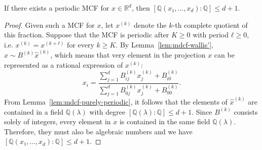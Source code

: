 \begin{theorem}
  \label{thm:mdcf-periodic}
  If there exists a periodic MCF for $x ∈ ℝ^d$,
  then $[ℚ(x₁, …, x_d) : ℚ] ≤ d + 1$.
\end{theorem}

\begin{proof}
  Given such a MCF for $x$, let $x^{(k)}$ denote the $k$-th complete quotient
  of this fraction.
  Suppose that the MCF is periodic after $K ≥ 0$ with period $ℓ ≥ 0$, i.e.
  $x^{(k)} = x^{(k+ℓ)}$ for every $k ≥ K$.
  By Lemma~\ref{lem:mdcf-wallis'}, $\hat x \sim B^{(k)} \hat x^{(k)}$,
  which means that very element in the projection $x$ can be represented
  as a rational expression of $x^{(k)}$:
  \[
    x_i = \frac{∑_{j=1}^d B_{ij}^{(k)} x_j^{(k)} + B_{i0}^{(k)}}{\sum_{j=1}^d B_{0j}^{(k)} x_j^{(k)} + B_{00}^{(k)}}.
  \]
  From Lemma~\ref{lem:mdcf-purely-periodic},
  it follows that the elements of $\hat x^{(k)}$
  are contained in a field $ℚ(λ)$ with degree $[ℚ(λ) : ℚ] ≤ d+1$.
  Since $B^{(k)}$ consists solely of integers, every element in $x$ is contained in the same field $ℚ(λ)$.
  Therefore, they must also be algebraic numbers
  and we have $[ℚ(x₁, …, x_d) : ℚ] ≤ d+1$.
\end{proof}

